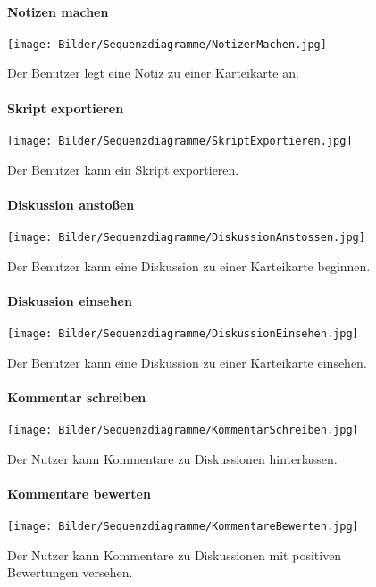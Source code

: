 \documentclass[12pt,a4paper]{article}
\begin{document}
\begin{figure}[H]
	\centering
	\paragraph{Notizen machen}
	\texttt{[image: Bilder/Sequenzdiagramme/NotizenMachen.jpg]}
	\caption{Der Benutzer legt eine Notiz zu einer Karteikarte an.}
	\label{SzNotizenMachen}
\end{figure}
\begin{figure}[H]
	\centering
	\paragraph{Skript exportieren}
	\texttt{[image: Bilder/Sequenzdiagramme/SkriptExportieren.jpg]}
	\caption{Der Benutzer kann ein Skript exportieren.}
	\label{SzSkriptExportieren}
\end{figure}
\begin{figure}[H]
	\centering
	\paragraph{Diskussion anstoßen}
	\texttt{[image: Bilder/Sequenzdiagramme/DiskussionAnstossen.jpg]}
	\caption{Der Benutzer kann eine Diskussion zu einer Karteikarte beginnen.}
	\label{SzDiskussionAnstossen}
\end{figure}
\begin{figure}[H]
	\centering
	\paragraph{Diskussion einsehen}
	\texttt{[image: Bilder/Sequenzdiagramme/DiskussionEinsehen.jpg]}
	\caption{Der Benutzer kann eine Diskussion zu einer Karteikarte einsehen.}
	\label{SzDiskussionEinsehen}
\end{figure}
\begin{figure}[H]
	\centering
	\paragraph{Kommentar schreiben}
	\texttt{[image: Bilder/Sequenzdiagramme/KommentarSchreiben.jpg]}
	\caption{Der Nutzer kann Kommentare zu Diskussionen hinterlassen.}
	\label{SzKommentarSchreiben}
\end{figure}
\begin{figure}[H]
	\centering
	\paragraph{Kommentare bewerten}
	\texttt{[image: Bilder/Sequenzdiagramme/KommentareBewerten.jpg]}
	\caption{Der Nutzer kann Kommentare zu Diskussionen mit positiven Bewertungen versehen.}
	\label{SzKommentareBewerten}
\end{figure}
\end{document}
